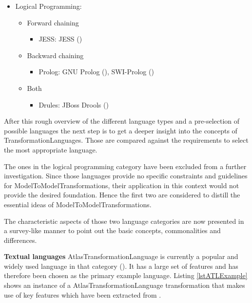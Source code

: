 \begin{itemize}
\item Logical Programming:
	\begin{itemize}		
	\item Forward chaining %
		\begin{itemize}
		\item JESS: JESS (\cite{SandiaNationalLaboratories2013}) %
		\end{itemize}
	\item Backward chaining
		\begin{itemize}
		\item Prolog: GNU Prolog (\cite{Diaz2013}), SWI-Prolog (\cite{Wielemaker2013})%
		\end{itemize}
	\item Both
		\begin{itemize}
		\item Drules: JBoss Drools (\cite{RedHat2014})%
		\end{itemize}
	\end{itemize}

\end{itemize}	

After this rough overview of the different language types and a pre-selection of possible languages the next step is to get a deeper insight into the concepts of \glspl{TransformationLanguage}. Those are compared against the requirements to select the most appropriate language. 

The ones in the logical programming category have been excluded from a further investigation. Since those languages provide no specific constraints and guidelines for \glspl{ModelToModelTransformation}, their application in this context would not provide the desired foundation. Hence the first two are considered to distill the essential ideas of \glspl{ModelToModelTransformation}.

The characteristic aspects of those two language categories are now presented in a survey-like manner to point out the basic concepts, commonalities and differences. %

\textbf{Textual languages} \Gls{AtlasTransformationLanguage} is currently a popular and widely used language in that category (\cite{IvanGarcia-Magarino2009}). It has a large set of features and has therefore been chosen as the primary example language. Listing \ref{lstATLExample} shows an instance of a \gls{AtlasTransformationLanguage} transformation that makes use of key features which have been extracted from \cite{INRIA2005}. 


